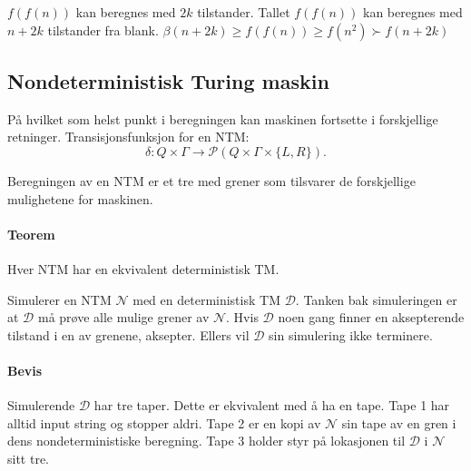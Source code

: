 \documentclass[11pt,a4paper]{article}
\begin{document}
$f(f(n))$ kan beregnes med $2k$ tilstander. Tallet $f(f(n))$ kan beregnes med $n+2k$ tilstander fra blank. $\beta(n+2k) \geq f(f(n)) \geq f(n^2) \succ f(n+2k)$

\subsection{Nondeterministisk Turing maskin}
På hvilket som helst punkt i beregningen kan maskinen fortsette i forskjellige retninger. Transisjonsfunksjon for en NTM:
$$\delta : Q \times \Gamma \rightarrow \mathcal{P}(Q \times \Gamma \times \{L,R\}).$$

Beregningen av en NTM er et tre med grener som tilsvarer de forskjellige mulighetene for maskinen.

\paragraph{Teorem} Hver NTM har en ekvivalent deterministisk TM.

Simulerer en NTM $\mathcal{N}$ med en deterministisk TM $\mathcal{D}$. Tanken bak simuleringen er at $\mathcal{D}$ må prøve alle mulige grener av $\mathcal{N}$. Hvis $\mathcal{D}$ noen gang finner en aksepterende tilstand i en av grenene, aksepter. Ellers vil $\mathcal{D}$ sin simulering ikke terminere.

\paragraph{Bevis} Simulerende $\mathcal{D}$ har tre taper. Dette er ekvivalent med å ha en tape. Tape 1 har alltid input string og stopper aldri. Tape 2 er en kopi av $\mathcal{N}$ sin tape av en gren i dens nondeterministiske beregning. Tape 3 holder styr på lokasjonen til $\mathcal{D}$ i $\mathcal{N}$ sitt tre.
\end{document}
